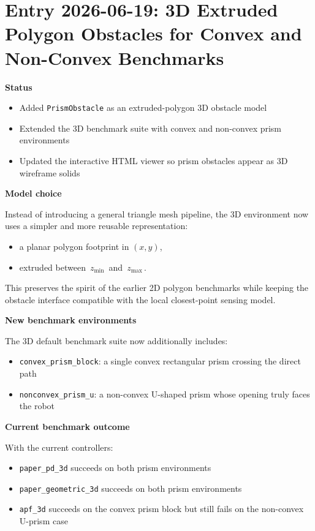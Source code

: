 \documentclass[11pt]{article}
\begin{document}
\section*{Entry 2026-06-19: 3D Extruded Polygon Obstacles for Convex and Non-Convex Benchmarks}

\textbf{Status}

\begin{itemize}[leftmargin=*]
  \item Added \texttt{PrismObstacle} as an extruded-polygon 3D obstacle model
  \item Extended the 3D benchmark suite with convex and non-convex prism environments
  \item Updated the interactive HTML viewer so prism obstacles appear as 3D wireframe solids
\end{itemize}

\textbf{Model choice}

Instead of introducing a general triangle mesh pipeline, the 3D environment now
uses a simpler and more reusable representation:

\begin{itemize}[leftmargin=*]
  \item a planar polygon footprint in \((x,y)\),
  \item extruded between \(\,z_{\min}\,\) and \(\,z_{\max}\,\).
\end{itemize}

This preserves the spirit of the earlier 2D polygon benchmarks while keeping
the obstacle interface compatible with the local closest-point sensing model.

\textbf{New benchmark environments}

The 3D default benchmark suite now additionally includes:

\begin{itemize}[leftmargin=*]
  \item \texttt{convex\_prism\_block}: a single convex rectangular prism crossing the direct path
  \item \texttt{nonconvex\_prism\_u}: a non-convex U-shaped prism whose opening truly faces the robot
\end{itemize}

\textbf{Current benchmark outcome}

With the current controllers:

\begin{itemize}[leftmargin=*]
  \item \texttt{paper\_pd\_3d} succeeds on both prism environments
  \item \texttt{paper\_geometric\_3d} succeeds on both prism environments
  \item \texttt{apf\_3d} succeeds on the convex prism block but still fails on the non-convex U-prism case
\end{itemize}
\end{document}
